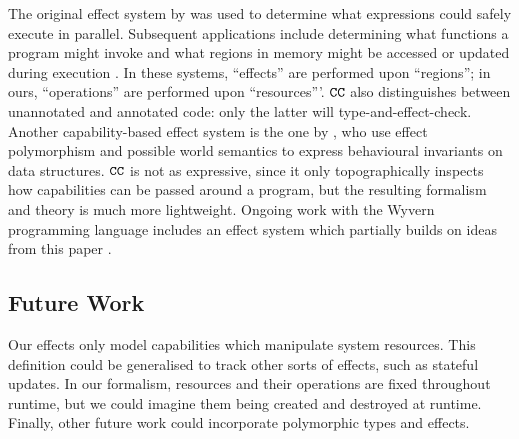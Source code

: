 The original effect system by \cite{lucassen88} was used to determine what expressions could safely execute in parallel. Subsequent applications include determining what functions a program might invoke \cite{tang94} and what regions in memory might be accessed or updated during execution \cite{talpin94}. In these systems, ``effects'' are performed upon ``regions''; in ours, ``operations'' are performed upon ``resources'''. $\mathtt{CC}$ also distinguishes between unannotated and annotated code: only the latter will type-and-effect-check. Another capability-based effect system is the one by \cite{devriese16}, who use effect polymorphism and possible world semantics to express behavioural invariants on data structures. $\mathtt{CC}$ is not as expressive, since it only topographically inspects how capabilities can be passed around a program, but the resulting formalism and theory is much more
lightweight. Ongoing work with the Wyvern programming language includes an
effect system which partially builds on ideas from this paper \cite{melicher18}.

\vspace{-0.6cm}
\subsection{Future Work}
\vspace{-0.2cm}

Our effects only model capabilities which manipulate system resources. This
definition could be generalised to track other sorts of effects, such as stateful
updates. In our formalism, resources and their operations are fixed throughout
runtime, but we could imagine them being created and destroyed at runtime. 
Finally, other future work could incorporate polymorphic types and effects.
